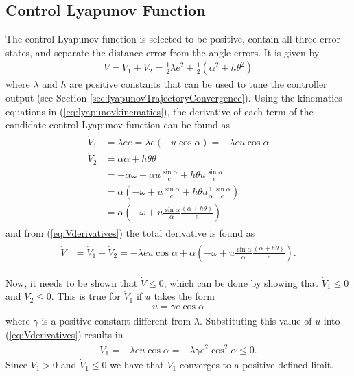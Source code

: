 \subsection{Control Lyapunov Function}
\label{sec:controllyapunov}
The control Lyapunov function is selected to be positive, contain all three error states, and separate the distance error from the angle errors. It is given by
\begin{align}
\label{eq:lyapunovfunction}
V = V_1 + V_2 = \frac{1}{2}\lambda e^2 + \frac{1}{2}\left(\alpha^2+h\theta^2\right)
\end{align}
where $\lambda$ and $h$ are positive constants that can be used to tune the controller output (see Section \ref{sec:lyapunovTrajectoryConvergence}). Using the kinematics equations in (\ref{eq:lyapunovkinematics}), the derivative of each term of the candidate control Lyapunov function can be found as
\begin{align}
\label{eq:Vderivatives}
\begin{split}
\dot{V}_1 &= \lambda e\dot{e} = \lambda e (-u\cos\alpha) = -\lambda eu\cos\alpha \\
\dot{V}_2 &= \alpha\dot{\alpha}+h\theta\dot{\theta} \\
&= -\alpha\omega + \alpha u\frac{\sin\alpha}{e} + h\theta u\frac{\sin\alpha}{e} \\
&= \alpha\left(-\omega + u\frac{\sin\alpha}{e} + h\theta u\frac{1}{\alpha}\frac{\sin\alpha}{e}\right) \\
&= \alpha\left(-\omega + u\frac{\sin\alpha}{\alpha}\frac{(\alpha+h\theta)}{e}\right)
\end{split}
\end{align}
and from (\ref{eq:Vderivatives}) the total derivative is found as
\begin{align}
\label{eq:lyapunovfunctionderivative}
\begin{split}
\dot{V} &= \dot{V}_1 + \dot{V}_2 = -\lambda e u\cos\alpha + \alpha\left(-\omega+u\frac{\sin\alpha}{\alpha}\frac{(\alpha+h\theta)}{e}\right).
\end{split}
\end{align}

Now, it needs to be shown that $\dot{V}\leq0$, which can be done by showing that $\dot{V}_1\leq0$ and $\dot{V}_2\leq0$. This is true for $\dot{V}_1$ if $u$ takes the form
\begin{align}
\label{eq:lyapunovu}
u = \gamma e\cos\alpha
\end{align}
where $\gamma$ is a positive constant different from $\lambda$. Substituting this value of $u$ into (\ref{eq:Vderivatives}) results in
\begin{align}
\label{eq:V1dotfinal}
\dot{V}_1 = -\lambda eu\cos\alpha = -\lambda\gamma e^2\cos^2\alpha \leq 0.
\end{align}
Since $V_1>0$ and $\dot{V}_1\leq0$ we have that $V_1$ converges to a positive defined limit.

